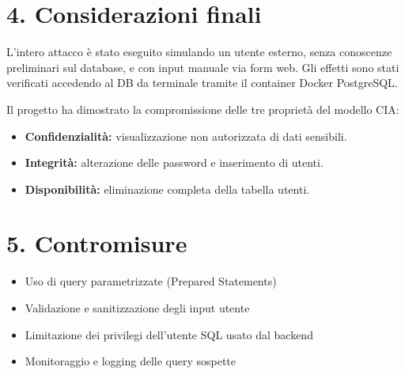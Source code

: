 \documentclass[a4paper,12pt]{article}
\begin{document}
\section*{4. Considerazioni finali}
L’intero attacco è stato eseguito simulando un utente esterno, senza conoscenze preliminari sul database, e con input manuale via form web. Gli effetti sono stati verificati accedendo al DB da terminale tramite il container Docker PostgreSQL.

Il progetto ha dimostrato la compromissione delle tre proprietà del modello CIA:

\begin{itemize}
    \item \textbf{Confidenzialità:} visualizzazione non autorizzata di dati sensibili.
    \item \textbf{Integrità:} alterazione delle password e inserimento di utenti.
    \item \textbf{Disponibilità:} eliminazione completa della tabella utenti.
\end{itemize}

\section*{5. Contromisure}
\begin{itemize}
    \item Uso di query parametrizzate (Prepared Statements)
    \item Validazione e sanitizzazione degli input utente
    \item Limitazione dei privilegi dell’utente SQL usato dal backend
    \item Monitoraggio e logging delle query sospette
\end{itemize}
\end{document}
